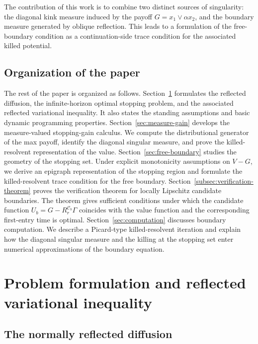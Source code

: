 \documentclass[pdflatex,sn-mathphys-num]{sn-jnl}
\theoremstyle{plain}
\theoremstyle{definition}
\theoremstyle{remark}
\numberwithin{equation}{section}
\begin{document}
The contribution of this work is to combine two distinct sources of singularity: the diagonal kink measure induced by the payoff $G=x_1\vee \alpha x_2$, and the boundary measure generated by oblique reflection. This leads to a formulation of the free-boundary condition as a continuation-side trace condition for the associated killed potential.

\subsection{Organization of the paper} \label{subsec:intro-organization} 

The rest of the paper is organized as follows. Section~\ref{sec:problem} formulates the reflected diffusion, the infinite-horizon optimal stopping problem, and the associated reflected variational inequality. It also states the standing assumptions and basic dynamic programming properties. Section~\ref{sec:measure-gain} develops the measure-valued stopping-gain calculus. We compute the distributional generator of the max payoff, identify the diagonal singular measure, and prove the killed-resolvent representation of the value.
Section~\ref{sec:free-boundary} studies the geometry of the stopping set. Under explicit monotonicity assumptions on \(V-G\), we derive an epigraph representation of the stopping region and formulate the killed-resolvent trace condition for the free boundary. Section~\ref{subsec:verification-theorem} proves the verification theorem for locally Lipschitz candidate boundaries. The theorem gives sufficient conditions under which the candidate function 
$\displaystyle U_b=G-R_r^{\mathcal C_b}\Gamma$ coincides with the value function and the corresponding first-entry time is optimal. Section~\ref{sec:computation} discusses boundary computation. We describe a Picard-type killed-resolvent iteration and explain how the diagonal singular measure and the killing at the stopping set enter numerical approximations of the boundary equation.  

\section{Problem formulation and reflected variational inequality} \label{sec:problem}  

\subsection{The normally reflected diffusion} \label{subsec:reflected-diffusion} 
\end{document}
